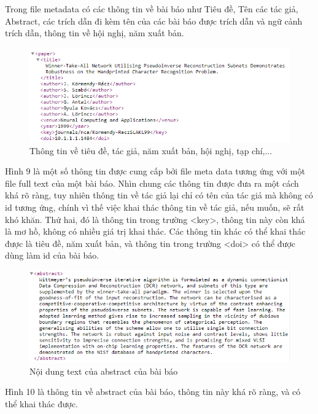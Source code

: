 \documentclass[12pt,a4paper]{article}
\begin{document}
Trong file metadata có các thông tin về bài báo như Tiêu đề, Tên các tác giả, Abstract, các trích dẫn đi kèm tên của các bài báo được trích dẫn và ngữ cảnh trích dẫn, thông tin về hội nghị, năm xuất bản. 


\begin{figure}[h]
    \centering
    \captionsetup{justification=centering}
    \includegraphics[width=1.\textwidth]{title_paper}
    \caption{Thông tin về tiêu đề, tác giả, năm xuất bản, hội nghị, tạp chí,...}
    \label{fig:title_paper}
\end{figure}

\noindent
Hình 9 là một số thông tin được cung cấp bởi file meta data tương ứng với một file full text của một bài báo. Nhìn chung các thông tin được đưa ra một cách khá rõ ràng, tuy nhiên thông tin về tác giả lại chỉ có tên của tác giả mà không có id tương ứng, chính vì thế việc khai thác thông tin về tác giả, nếu muốn, sẽ rất khó khăn. Thứ hai, đó là thông tin trong trường <key>, thông tin này còn khá là mơ hồ, không có nhiều giá trị khai thác. Các thông tin khác có thể khai thác được là tiêu đề, năm xuất bản, và thông tin trong trường <doi> có thể được dùng làm id của bài báo.

\begin{figure}[h]
    \centering
    \includegraphics[width=1.\textwidth]{abstract}
    \caption{Nội dung text của abstract của bài báo}
    \label{fig:title_paper}
\end{figure}

\newpage
\noindent
Hình 10 là thông tin về abstract của bài báo, thông tin này khá rõ ràng, và có thể khai thác được.
\end{document}
